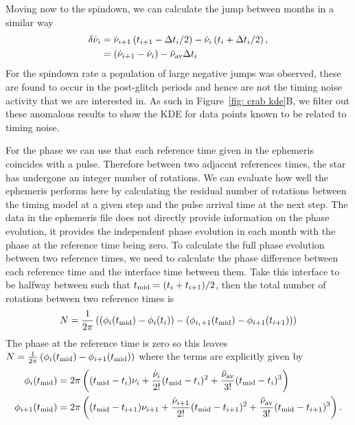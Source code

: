 \documentclass[../full_thesis/full_thesis.tex]{subfiles}
\begin{document}
{Moving now to the spindown, we can calculate the jump between months in a similar way
\begin{align}
\delta\dot{\nu}_{i} & = \dot{\nu}_{i+1}\left(t_{i+1}-\Delta t_{i}/2\right) -  \dot{\nu}_{i}\left(t_{i}+\Delta t_{i}/2\right), \\
& = \left(\dot{\nu}_{i+1}-\dot{\nu}_{i}\right) -  \ddot{\nu}_{\textrm{av}} \Delta t_{i}
\label{eqn: crab spindown residuals}
\end{align}
For the spindown rate a population of large negative jumps was observed, these are
found to occur in the post-glitch periods and hence are not the timing noise
activity that we are interested in. As such in Figure~\ref{fig: crab kde}B, we
filter out these anomalous results to show the KDE for data points known to be
related to timing noise.

For the phase we can use that each reference time given in the ephemeris
coincides with a pulse. Therefore between two adjacent references times, the
star has undergone an integer number of rotations. We can evaluate how well the
ephemeris performs here by calculating the residual number of rotations between
the timing model at a given step and the pulse arrival time at the next step.
The data in the ephemeris file does not directly provide information on the
phase evolution, it provides the independent phase evolution in each month with
the phase at the reference time being zero. To calculate the full phase
evolution between two reference times, we need to calculate the phase
difference between each reference time and the interface time between them.
Take this interface to be halfway between such that $t_{\textrm{mid}}=(t_{i} +
t_{i+1})/2$, then the total number of rotations between two reference times is
\begin{equation}
    N = \frac{1}{2\pi}\left(\left(\phi_{i}(t_{\textrm{mid}}) - \phi_{i}(t_{i})\right) -
    \left(\phi_{i_i+1}(t_{\textrm{mid}}) - \phi_{i+1}(t_{i+1})\right)\right)
\end{equation}
The phase at the reference time is zero so this leaves $N =
\frac{1}{2\pi}\left(\phi_{i}(t_{\textrm{mid}}) - \phi_{i+1}(t_{\textrm{mid}})\right)$ where the terms
are explicitly given by
\begin{align}
\phi_{i}(t_{\textrm{mid}}) & = 2\pi\left((t_{\textrm{mid}} - t_{i})\nu_{i} +  \frac{\dot{\nu}_{i}}{2!}(t_{\textrm{mid}} - t_{i})^{2}+\frac{\ddot{\nu}_{\textrm{av}}}{3!}(t_{\textrm{mid}} - t_{i})^{3}\right) \\
\phi_{i+1}(t_{\textrm{mid}}) & = 2\pi\left((t_{\textrm{mid}} - t_{i+1})\nu_{i+1} +  \frac{\dot{\nu}_{i+1}}{2!}(t_{\textrm{mid}} - t_{i+1})^{2}+\frac{\ddot{\nu}_{\textrm{av}}}{3!}(t_{\textrm{mid}} - t_{i+1})^{3}\right) .
\end{align}

}
\end{document}
